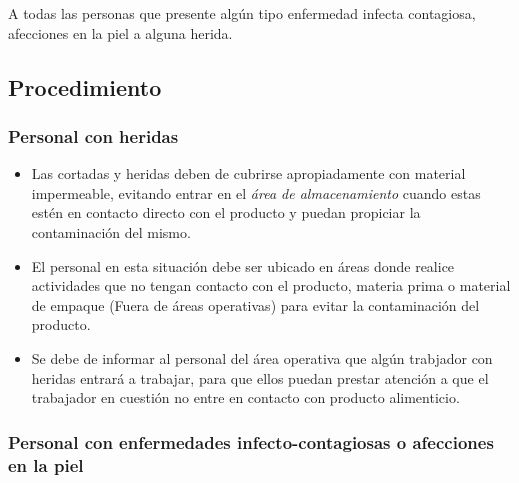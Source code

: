 A todas las personas que presente algún tipo enfermedad infecta contagiosa, afecciones en la piel a alguna herida.

\subsection{Procedimiento}

\subsubsection{Personal con heridas}

\begin{itemize}
	\item Las cortadas y heridas deben de cubrirse apropiadamente con material impermeable, evitando entrar en el \emph{área de almacenamiento} cuando estas estén en contacto directo con el producto y puedan propiciar la contaminación del mismo.
	\item El personal en esta situación debe ser ubicado en áreas donde realice actividades que no tengan contacto con el producto, materia prima o material de empaque (Fuera de áreas operativas) para evitar la contaminación del producto.
	\item Se debe de informar al personal del área operativa que algún trabjador con heridas entrará a trabajar, para que ellos puedan prestar atención a que el trabajador en cuestión no entre en contacto con producto alimenticio.
\end{itemize}

\subsubsection{Personal con enfermedades infecto-contagiosas o afecciones en la piel}

